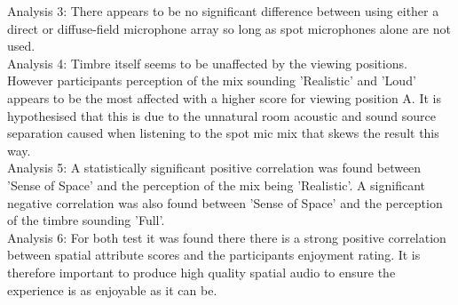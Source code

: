 		Analysis 3: There appears to be no significant difference between using either a direct or diffuse-field microphone array so long as spot microphones alone are not used.\\

		Analysis 4: Timbre itself seems to be unaffected by the viewing positions. However participants perception of the mix sounding 'Realistic' and 'Loud' appears to be the most affected with a higher score for viewing position A. It is hypothesised that this is due to the unnatural room acoustic and sound source separation caused when listening to the spot mic mix that skews the result this way.\\

		Analysis 5: A statistically significant positive correlation was found between 'Sense of Space' and the perception of the mix being 'Realistic'. A significant negative correlation was also found between 'Sense of Space' and the perception of the timbre sounding 'Full'.\\

		Analysis 6: For both test it was found there there is a strong positive correlation between spatial attribute scores and the participants enjoyment rating. It is therefore important to produce high quality spatial audio to ensure the experience is as enjoyable as it can be.

